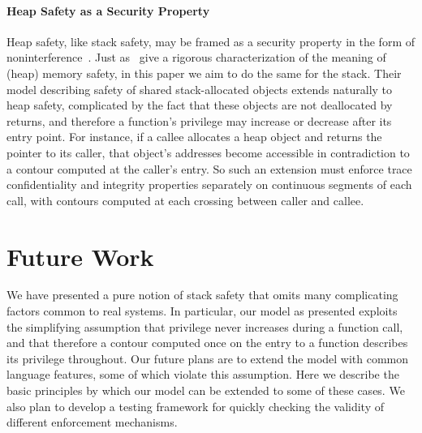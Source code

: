 \documentclass[acmsmall,review,anonymous]{acmart}\settopmatter{printfolios=true,printccs=false,printacmref=false}
\begin{document}
\paragraph{Heap Safety as a Security Property}

Heap safety, like stack safety, may be framed as a security property
in the form of
noninterference~\citep{DBLP:conf/post/AmorimHP18}\ifaftersubmission{}\fi. Just
as~\citeauthor{DBLP:conf/post/AmorimHP18} give a rigorous
characterization of the meaning of (heap) memory safety, in this paper
we aim to do the same for the stack.
%
Their model describing safety of shared stack-allocated
objects extends naturally to heap safety, complicated by the fact that
these objects are not deallocated by returns, and therefore a
function's privilege may increase or decrease after its entry
point. For instance, if a callee allocates a heap object and returns
the pointer to its caller, that object's addresses become accessible
in contradiction to a contour computed at the caller's entry. So such
an extension must enforce trace confidentiality and integrity
properties separately on continuous segments of each call, with
contours computed at each crossing between caller and callee.  

\section{Future Work}
  \label{sec:future}

  We have presented a pure notion of stack safety that omits many complicating
  factors common to real systems. In particular, our model as presented exploits
  the simplifying assumption that privilege never increases during a function
  call, and that therefore a contour computed once on the entry to a function
  describes its privilege throughout. Our future plans are to extend the model
  with common language features, some of which violate this assumption. Here we
  describe the basic principles by which our model can be extended to some of
  these cases. We also plan to develop a testing framework for quickly
  checking the validity of different enforcement mechanisms.
\end{document}
